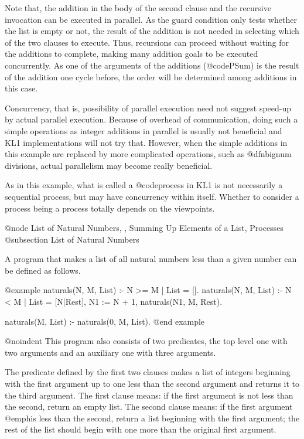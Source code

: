 {Note that, the addition in the body of the second clause and the
recursive invocation can be executed in parallel.  As the guard
condition only tests whether the list is empty or not, the result of the
addition is not needed in selecting which of the two clauses to execute.
Thus, recursions can proceed without waiting for the additions to
complete, making many addition goals to be executed concurrently.  As
one of the arguments of the additions (@code{PSum}) is the result of the
addition one cycle before, the order will be determined among additions
in this case.

Concurrency, that is, possibility of parallel execution need not suggest
speed-up by actual parallel execution.  Because of overhead of
communication, doing such a simple operations as integer additions in
parallel is usually not beneficial and KL1 implementations will not try
that.  However, when the simple additions in this example are replaced
by more complicated operations, such as @dfn{bignum} divisions, actual
parallelism may become really beneficial.

As in this example, what is called a @code{process} in KL1 is not
necessarily a sequential process, but may have concurrency within
itself.  Whether to consider a process being a process totally depends
on the viewpoints.

@node List of Natural Numbers,  , Summing Up Elements of a List, Processes
@subsection List of Natural Numbers

A program that makes a list of all natural numbers less than a given
number can be defined as follows.

@example
naturals(N, M, List) :- N >= M | List = [].
naturals(N, M, List) :- N < M |
    List = [N|Rest],
    N1 := N + 1,
    naturals(N1, M, Rest).

naturals(M, List) :- naturals(0, M, List).
@end example

@noindent
This program also consists of two predicates, the top level one with
two arguments and an auxiliary one with three arguments.

The predicate defined by the first two clauses makes a list of integers
beginning with the first argument up to one less than the second
argument and returns it to the third argument.  The first clause means:
if the first argument is not less than the second, return an empty list.
The second clause means: if the first argument @emph{is} less than the
second, return a list beginning with the first argument; the rest of the
list should begin with one more than the original first argument.

}
